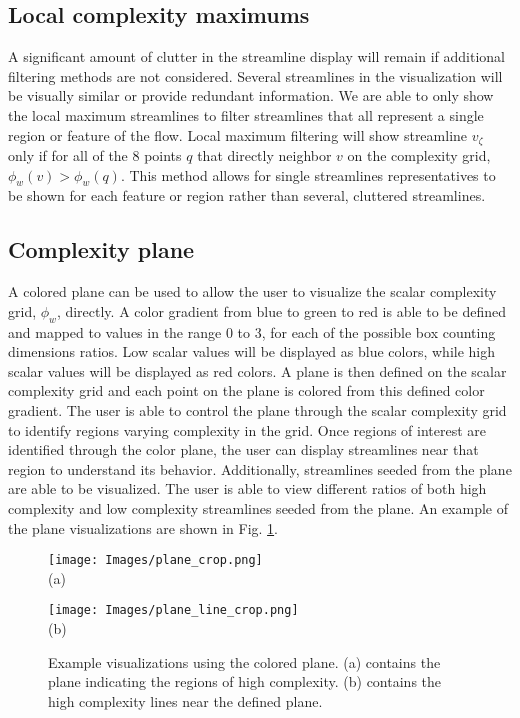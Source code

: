 \documentclass{egpubl}
\begin{document}
\subsection{Local complexity maximums}
A significant amount of clutter in the streamline display will remain if additional filtering methods are not considered.
Several streamlines in the visualization will be visually similar or provide redundant information.
We are able to only show the local maximum streamlines to filter streamlines that all represent a single region or feature of the flow.
Local maximum filtering will show streamline $v_\zeta$ only if for all of the 8 points $q$ that directly neighbor $v$ on the complexity grid, $\phi_w(v) > \phi_w(q)$.
This method allows for single streamlines representatives to be shown for each feature or region rather than several, cluttered streamlines.

\subsection{Complexity plane}
A colored plane can be used to allow the user to visualize the scalar complexity grid, $\phi_w$, directly.
A color gradient from blue to green to red is able to be defined and mapped to values in the range 0 to 3, for each of the possible box counting dimensions ratios.
Low scalar values will be displayed as blue colors, while high scalar values will be displayed as red colors.
A plane is then defined on the scalar complexity grid and each point on the plane is colored from this defined color gradient.
The user is able to control the plane through the scalar complexity grid to identify regions varying complexity in the grid.
Once regions of interest are identified through the color plane, the user can display streamlines near that region to understand its behavior.
Additionally, streamlines seeded from the plane are able to be visualized.
The user is able to view different ratios of both high complexity and low complexity streamlines seeded from the plane.
An example of the plane visualizations are shown in Fig. \ref{fig:plane}.

\begin{figure}[h]
        \centering
                \begin{minipage}{0.45\linewidth}
                        \small \centering
                        \texttt{[image: Images/plane\_crop.png]}\\(a)
                \end{minipage}
                \begin{minipage}{0.45\linewidth}
                        \small \centering
                        \texttt{[image: Images/plane\_line\_crop.png]}\\(b)
                \end{minipage}
        \caption{Example visualizations using the colored plane. (a) contains the plane indicating the regions of high complexity. (b) contains the high complexity lines near the defined plane.}
        \label{fig:plane}
\end{figure}
\end{document}
